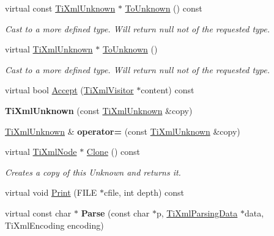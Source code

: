 \begin{DoxyCompactItemize}
\item 
\hypertarget{class_ti_xml_unknown_ab0313e5fe77987d746ac1a97a254419d}{virtual const \hyperlink{class_ti_xml_unknown}{Ti\+Xml\+Unknown} $\ast$ \hyperlink{class_ti_xml_unknown_ab0313e5fe77987d746ac1a97a254419d}{To\+Unknown} () const }\label{class_ti_xml_unknown_ab0313e5fe77987d746ac1a97a254419d}

\begin{DoxyCompactList}\small\item\em Cast to a more defined type. Will return null not of the requested type. \end{DoxyCompactList}\item 
\hypertarget{class_ti_xml_unknown_a67c9fd22940e8c47f706a72cdd2e332c}{virtual \hyperlink{class_ti_xml_unknown}{Ti\+Xml\+Unknown} $\ast$ \hyperlink{class_ti_xml_unknown_a67c9fd22940e8c47f706a72cdd2e332c}{To\+Unknown} ()}\label{class_ti_xml_unknown_a67c9fd22940e8c47f706a72cdd2e332c}

\begin{DoxyCompactList}\small\item\em Cast to a more defined type. Will return null not of the requested type. \end{DoxyCompactList}\item 
virtual bool \hyperlink{class_ti_xml_unknown_a4e54d7482e05a837cf83c925cc683380}{Accept} (\hyperlink{class_ti_xml_visitor}{Ti\+Xml\+Visitor} $\ast$content) const 
\item 
\hypertarget{class_ti_xml_unknown_abe798ff4feea31474850c7f0de6bdf5e}{{\bfseries Ti\+Xml\+Unknown} (const \hyperlink{class_ti_xml_unknown}{Ti\+Xml\+Unknown} \&copy)}\label{class_ti_xml_unknown_abe798ff4feea31474850c7f0de6bdf5e}

\item 
\hypertarget{class_ti_xml_unknown_a60560b5aacb4bdc8b2b5f02f0a99c5c0}{\hyperlink{class_ti_xml_unknown}{Ti\+Xml\+Unknown} \& {\bfseries operator=} (const \hyperlink{class_ti_xml_unknown}{Ti\+Xml\+Unknown} \&copy)}\label{class_ti_xml_unknown_a60560b5aacb4bdc8b2b5f02f0a99c5c0}

\item 
\hypertarget{class_ti_xml_unknown_a0960bb7428b3f341da46244229604d73}{virtual \hyperlink{class_ti_xml_node}{Ti\+Xml\+Node} $\ast$ \hyperlink{class_ti_xml_unknown_a0960bb7428b3f341da46244229604d73}{Clone} () const }\label{class_ti_xml_unknown_a0960bb7428b3f341da46244229604d73}

\begin{DoxyCompactList}\small\item\em Creates a copy of this Unknown and returns it. \end{DoxyCompactList}\item 
virtual void \hyperlink{class_ti_xml_unknown_a31ba089a40fb5a1869750fce09b0bacb}{Print} (F\+I\+L\+E $\ast$cfile, int depth) const 
\item 
\hypertarget{class_ti_xml_unknown_a0d0a0f8ec748f12bd1dc3ef6d64d7c87}{virtual const char $\ast$ {\bfseries Parse} (const char $\ast$p, \hyperlink{class_ti_xml_parsing_data}{Ti\+Xml\+Parsing\+Data} $\ast$data, Ti\+Xml\+Encoding encoding)}\label{class_ti_xml_unknown_a0d0a0f8ec748f12bd1dc3ef6d64d7c87}


\end{DoxyCompactItemize}

